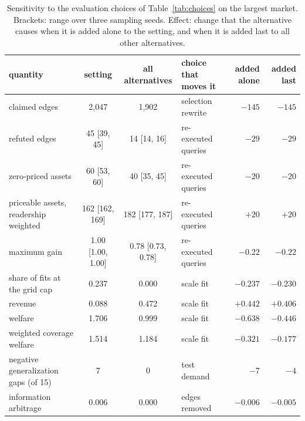 \begin{table}[t]
  \centering
  \caption{Sensitivity to the evaluation choices of Table~\ref{tab:choices} on the largest \sqlshare{} market. Brackets: range over three sampling seeds. Effect: change that the alternative causes when it is added alone to the setting, and when it is added last to all other alternatives.}
  \label{tab:sensitivity}
  \begin{tabular}{lcclrr}
    \toprule
    quantity & setting & all alternatives & choice that moves it & added alone & added last \\
    \midrule
    claimed edges & 2,047 & 1,902 & selection rewrite & $-145$ & $-145$ \\
    refuted edges & 45 [39, 45] & 14 [14, 16] & re-executed queries & $-29$ & $-29$ \\
    zero-priced assets & 60 [53, 60] & 40 [35, 45] & re-executed queries & $-20$ & $-20$ \\
    priceable assets, readership weighted & 162 [162, 169] & 182 [177, 187] & re-executed queries & $+20$ & $+20$ \\
    \qirana{} maximum gain & 1.00 [1.00, 1.00] & 0.78 [0.73, 0.78] & re-executed queries & $-0.22$ & $-0.22$ \\
    share of fits at the grid cap & 0.237 & 0.000 & scale fit & $-0.237$ & $-0.230$ \\
    \querymarket{} revenue & 0.088 & 0.472 & scale fit & $+0.442$ & $+0.406$ \\
    \querymarket{} welfare & 1.706 & 0.999 & scale fit & $-0.638$ & $-0.446$ \\
    \qirana{} weighted coverage welfare & 1.514 & 1.184 & scale fit & $-0.321$ & $-0.177$ \\
    negative generalization gaps (of 15) & 7 & 0 & test demand & $-7$ & $-4$ \\
    \qirana{} information arbitrage & 0.006 & 0.000 & edges removed & $-0.006$ & $-0.005$ \\
    \bottomrule
  \end{tabular}
\end{table}
